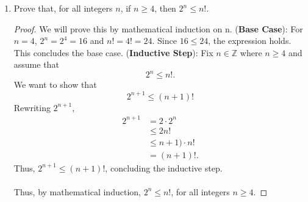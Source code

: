 \documentclass{article}
\begin{document}
\begin{enumerate}
    	\item Prove that, for all integers $n$, if $n \ge 4$, then $2^n \le n!$.
                \begin{proof}
                    We will prove this by mathematical induction on n.
                    \ppar (\textbf{Base Case}): For $n = 4$, $2^n = 2^4 = 16$ and $n! = 4! = 24$. Since $16 \le 24$, the expression holds. This concludes the base case.
                    \ppar (\textbf{Inductive Step}): Fix $n\in\mathbb{Z}$ where $n \ge 4$ and assume that
                        \[
    			             2^n \le n!.
    		          \]
                    \ppar We want to show that
                        \[
    			             2^{n + 1} \le (n + 1)!
    		          \]
                    \ppar Rewriting $2^{n + 1}$, 
                        \begin{align*}
                            2^{n + 1} &= 2 \cdot 2^n \\ 
                            &\le 2n! \\
                            &\le n + 1)\cdot n! \\
                            &= (n + 1)!.
                        \end{align*}
                    \ppar Thus, $2^{n + 1} \le (n + 1)!$, concluding the inductive step.
                    \\\\ Thus, by mathematical induction, $2^n \le n!$, for all integers $n \ge 4$.
                \end{proof}


\end{enumerate}
\end{document}
